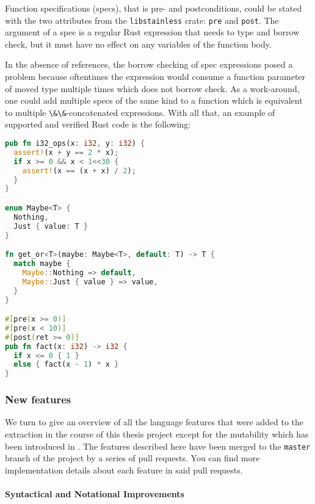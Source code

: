 Function specifications (specs), that is pre- and postconditions, could
be stated with the two attributes from the
\passthrough{\lstinline!libstainless!} crate:
\passthrough{\lstinline!pre!} and \passthrough{\lstinline!post!}. The
argument of a spec is a regular Rust expression that needs to type and
borrow check, but it must have no effect on any variables of the
function body.

In the absence of references, the borrow checking of spec expressions
posed a problem because oftentimes the expression would consume a
function parameter of moved type multiple times which does not borrow
check. As a work-around, one could add multiple specs of the same kind
to a function which is equivalent to multiple
\passthrough{\lstinline!\&\&!}-concatenated expressions. With all that,
an example of supported and verified Rust code is the following:

\begin{lstlisting}[language=Rust]
pub fn i32_ops(x: i32, y: i32) {
  assert!(x + y == 2 * x);
  if x >= 0 && x < 1<<30 {
    assert!(x == (x + x) / 2);
  }
}

enum Maybe<T> {
  Nothing,
  Just { value: T }
}

fn get_or<T>(maybe: Maybe<T>, default: T) -> T {
  match maybe {
    Maybe::Nothing => default,
    Maybe::Just { value } => value,
  }
}

#[pre(x >= 0)]
#[pre(x < 10)]
#[post(ret >= 0)]
pub fn fact(x: i32) -> i32 {
  if x <= 0 { 1 }
  else { fact(x - 1) * x }
}
\end{lstlisting}

\subsubsection{New features}

We turn to give an overview of all the language features that were added
to the extraction in the course of this thesis project except for the
mutability which has been introduced in . The
features described here have been merged to the
\passthrough{\lstinline!master!} branch of the project by a series of
pull requests. You can find more implementation details about each
feature in said pull requests.

\paragraph{Syntactical and Notational Improvements}

